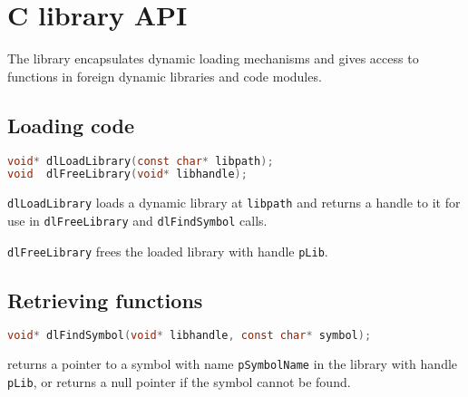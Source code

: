%
%
%
%

\newpage
\section{ C library API}

The  library encapsulates dynamic loading mechanisms and
gives access to functions in foreign dynamic libraries and code modules.

\subsection{Loading code}

\begin{lstlisting}[language=c,label=dl-load]
void* dlLoadLibrary(const char* libpath);
void  dlFreeLibrary(void* libhandle);
\end{lstlisting}

\lstinline{dlLoadLibrary} loads a dynamic library at \lstinline{libpath}
and returns a handle to it for use in \lstinline{dlFreeLibrary} and
\lstinline{dlFindSymbol} calls.

\lstinline{dlFreeLibrary} frees the loaded library with handle \lstinline{pLib}.

\subsection{Retrieving functions}

\begin{lstlisting}[language=c]
void* dlFindSymbol(void* libhandle, const char* symbol);
\end{lstlisting}

returns a pointer to a symbol with name \lstinline{pSymbolName} in the
library with handle \lstinline{pLib}, or returns a null pointer if the symbol cannot
be found.
